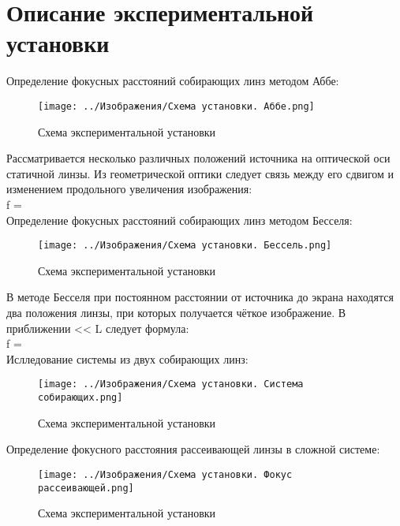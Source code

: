 \section*{Описание экспериментальной установки}

Определение фокусных расстояний собирающих линз методом Аббе:

\begin{figure}[H]
	\centering
	\texttt{[image: ../Изображения/Схема установки. Аббе.png]}
	\caption{Схема экспериментальной установки}
\end{figure}

Рассматривается несколько различных положений источника на оптической оси статичной линзы. Из геометрической оптики следует связь между его сдвигом и изменением продольного увеличения изображения: \\
f = \\

Определение фокусных расстояний собирающих линз методом Бесселя:

\begin{figure}[H]
	\centering
	\texttt{[image: ../Изображения/Схема установки. Бессель.png]}
	\caption{Схема экспериментальной установки}
\end{figure}

В методе Бесселя при постоянном расстоянии от источника до экрана находятся два положения линзы, при которых получается чёткое изображение. В приближении \delta << L следует формула: \\
f = \\

Ислледование системы из двух собирающих линз:

\begin{figure}[H]
	\centering
	\texttt{[image: ../Изображения/Схема установки. Система собирающих.png]}
	\caption{Схема экспериментальной установки}
\end{figure}


Определение фокусного расстояния рассеивающей линзы в сложной системе:

\begin{figure}[H]
	\centering
	\texttt{[image: ../Изображения/Схема установки. Фокус рассеивающей.png]}
	\caption{Схема экспериментальной установки}
\end{figure}

